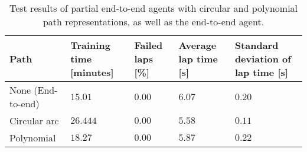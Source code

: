 \begin{table}[!htb]
\centering
\renewcommand{\arraystretch}{1.2}
\small
\begin{tabularx}{\textwidth}{RLLLL} 
    \hline
    \textbf{Path} & \textbf{Training time [minutes]} & \textbf{Failed laps [\%]} & \textbf{Average lap time [s]} & \textbf{Standard deviation of lap time [s]}\\ 
    \hline
    None (End-to-end)   & $15.01$    & $0.00$    & $6.07$    & $0.20$ \\     
    Circular arc        & $26.444$   & $0.00$    & $5.58$    & $0.11$ \\      
    Polynomial          & $18.27$    & $0.00$    & $5.87$    & $0.22$ \\
    \hline
\end{tabularx}
\caption[Test results of partial end-to-end agents with circular and polynomial path representations]{Test results of partial end-to-end agents with circular and polynomial path representations, as well as the end-to-end agent.}
\label{tab:path_test_results}
\end{table}

